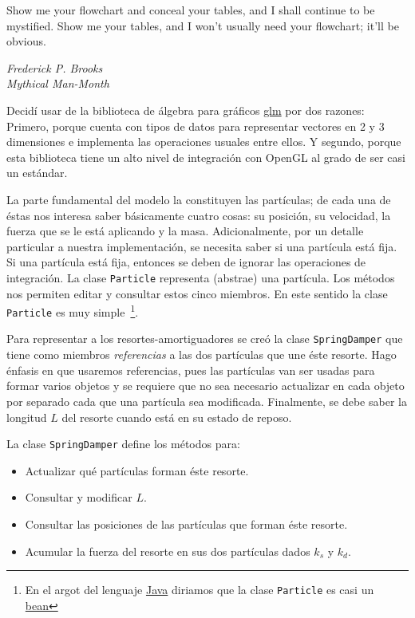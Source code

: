 \epigraph{Show me your flowchart and conceal your tables, and I shall continue to be mystified. Show me your tables, and I won't usually need your flowchart; it'll be obvious.}{\textit{Frederick P. Brooks \\ Mythical Man-Month}}

Decidí usar de la biblioteca de álgebra para gráficos \href{http://github.com/g-truc/glm}{glm} por dos razones:
Primero, porque cuenta con tipos de datos para representar vectores en 2 y 3 dimensiones e implementa las operaciones usuales entre ellos.
Y segundo, porque esta biblioteca tiene un alto nivel de integración con OpenGL al grado de ser casi un estándar.

La parte fundamental del modelo la constituyen las partículas; de cada una de éstas nos interesa saber básicamente cuatro cosas: su posición, su velocidad, la fuerza que se le está aplicando y la masa.
Adicionalmente, por un detalle particular a nuestra implementación, se necesita saber si una partícula está fija.
Si una partícula está fija, entonces se deben de ignorar las operaciones de integración.
La clase \texttt{Particle} representa (abstrae) una partícula. Los métodos nos permiten editar y consultar estos cinco miembros.
En este sentido la clase \texttt{Particle} es muy simple~\footnote{En el argot del lenguaje \href{http://www.java.com/en/}{Java} diriamos que la clase \texttt{Particle} es casi un \href{http://en.wikipedia.org/wiki/JavaBeans}{bean}}.

Para representar a los resortes-amortiguadores se creó la clase \texttt{SpringDamper} que tiene como miembros \emph{referencias} a las dos partículas que une éste resorte.
Hago énfasis en que usaremos referencias, pues las partículas van ser usadas para formar varios objetos y se requiere que no sea necesario actualizar en cada objeto por separado cada que una partícula sea modificada. Finalmente, se debe saber la longitud $L$ del resorte cuando está en su estado de reposo.

La clase \texttt{SpringDamper} define los métodos para:
\begin{itemize}
 \item Actualizar qué partículas forman éste resorte.
 \item Consultar y modificar $L$.
 \item Consultar las posiciones de las partículas que forman éste resorte.
 \item Acumular la fuerza del resorte en sus dos partículas dados $k_s$ y $k_d$.
\end{itemize}

